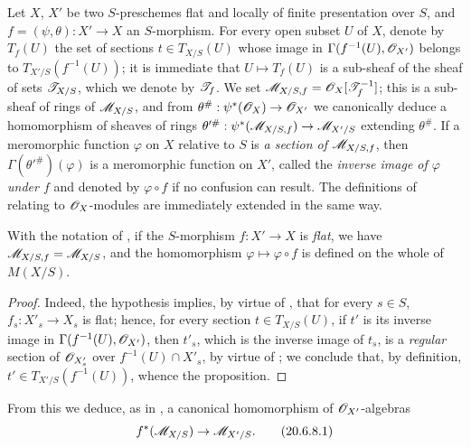 \begin{env}[20.6.7]\label{IV.20.6.7}
Let $X$, $X'$ be two $S$-preschemes flat and locally of finite presentation over $S$, and $f=(\psi,\theta):X'\to X$ an $S$-morphism.
For every open subset $U$ of $X$, denote by $T_f(U)$ the set of sections $t\in T_{X/S}(U)$ whose image in $\Gamma(f^{-1}(U),\mathscr{O}_{X'})$ belongs to $T_{X'/S}(f^{-1}(U))$; it is immediate that $U\mapsto T_f(U)$ is a sub-sheaf of the sheaf of sets $\mathscr{T}_{X/S}$, which we denote by $\mathscr{T}_f$.
We set $\mathscr{M}_{X/S,f}=\mathscr{O}_X[\mathscr{T}_f^{-1}]$; this is a sub-sheaf of rings of $\mathscr{M}_{X/S}$, and from $\theta^\#: \psi^*(\mathscr{O}_X)\to\mathscr{O}_{X'}$ we canonically deduce a homomorphism of sheaves of rings $\theta'^\#: \psi^*(\mathscr{M}_{X/S,f})\to\mathscr{M}_{X'/S}$ extending $\theta^\#$.
If a meromorphic function $\varphi$ on $X$ relative to $S$ is \emph{a section of $\mathscr{M}_{X/S,f}$}, then $\Gamma(\theta'^\#)(\varphi)$ is a meromorphic function on $X'$, called the \emph{inverse image of $\varphi$ under $f$} and denoted by $\varphi\circ f$ if no confusion can result.
The definitions of  relating to $\mathscr{O}_X$-modules are immediately extended in the same way.
\end{env}

\begin{proposition}[20.6.8]
\label{IV.20.6.8}
With the notation of , if the $S$-morphism $f:X'\to X$ is \emph{flat}, we have $\mathscr{M}_{X/S,f}=\mathscr{M}_{X/S}$, and the homomorphism $\varphi\mapsto\varphi\circ f$ is defined on the whole of $M(X/S)$.
\end{proposition}

\begin{proof}
Indeed, the hypothesis implies, by virtue of , that for every $s\in S$, $f_s:X'_s\to X_s$ is flat; hence, for every section $t\in T_{X/S}(U)$, if $t'$ is its inverse image in $\Gamma(f^{-1}(U),\mathscr{O}_{X'})$, then $t'_{s}$, which is the inverse image of $t_s$, is a \emph{regular} section of $\mathscr{O}_{X'_s}$ over $f^{-1}(U)\cap X'_s$, by virtue of ; we conclude that, by definition, $t'\in T_{X'/S}(f^{-1}(U))$, whence the proposition.
\end{proof}

From this we deduce, as in , a canonical homomorphism of $\mathscr{O}_{X'}$-algebras
\[
\label{IV.20.6.8.1}
  f^*(\mathscr{M}_{X/S})\to\mathscr{M}_{X'/S}.
  \tag{20.6.8.1}
\]

